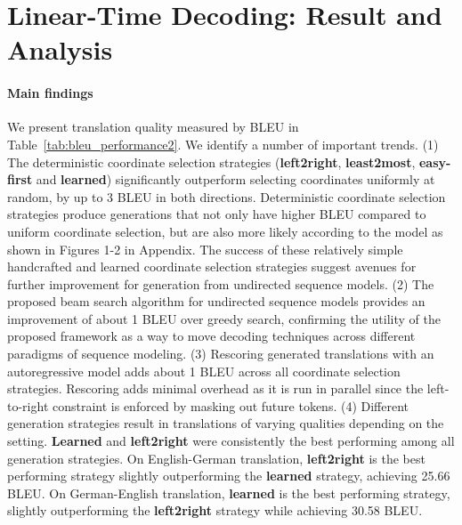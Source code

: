 \documentclass{article}
\begin{document}
\section{Linear-Time Decoding: Result and Analysis}

\begin{figure*}[t]
    \centering
    
    \label{fig:gen-order}
\end{figure*}

\paragraph{Main findings} 

We present translation quality measured by BLEU \citep{papineni2002bleu} in Table~\ref{tab:bleu_performance2}. We identify a number of important trends. 
(1) The deterministic coordinate selection strategies ({\bf left2right}, {\bf least2most}, {\bf easy-first} and {\bf learned}) significantly outperform selecting coordinates uniformly at random, by up to 3 BLEU in both directions. Deterministic coordinate selection strategies produce generations that not only have higher BLEU compared to uniform coordinate selection, but are also more likely according to the model as shown in Figures 1-2 in Appendix. The success of these relatively simple handcrafted and learned coordinate selection strategies suggest avenues for further improvement for generation from undirected sequence models.
(2) The proposed beam search algorithm for undirected sequence models provides an improvement of about 1 BLEU over greedy search, confirming the utility of the proposed framework as a way to move decoding techniques across different paradigms of sequence modeling. 
(3) Rescoring generated translations 
with an autoregressive model adds about 1 BLEU across all coordinate selection strategies.
Rescoring adds minimal overhead as it is run in parallel since the left-to-right constraint is enforced by masking out future tokens.
(4) Different generation strategies result in translations of varying qualities depending on the setting. {\bf Learned} and {\bf left2right} were consistently the best performing among all generation strategies. On English-German translation, {\bf left2right} is the best performing strategy slightly outperforming the {\bf learned} strategy, achieving 25.66 BLEU. On German-English translation, {\bf learned} is the best performing strategy, slightly outperforming the {\bf left2right} strategy while achieving 30.58 BLEU.
\end{document}
